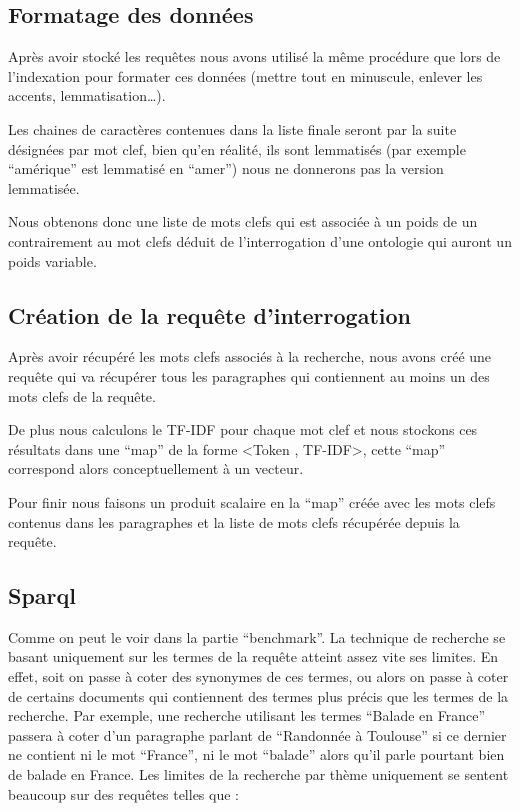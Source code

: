 \documentclass{article}
\begin{document}
\subsection{Formatage des données}

Après avoir stocké les requêtes nous avons utilisé la même procédure que lors de
l’indexation pour formater ces données (mettre tout en minuscule, enlever les
accents, lemmatisation…). 

Les chaines de caractères contenues dans la liste finale seront par la suite désignées par
mot clef, bien qu’en réalité, ils sont lemmatisés (par exemple “amérique” est
lemmatisé en “amer”) nous ne donnerons pas la version lemmatisée.

Nous obtenons donc une liste de mots clefs qui est associée à un poids de un
contrairement au mot clefs déduit de l’interrogation d’une ontologie qui auront un
poids variable.


\subsection{Création de la requête d'interrogation}

Après avoir récupéré les mots clefs associés à la recherche, nous avons créé une
requête qui va récupérer tous les paragraphes qui contiennent au moins un des mots
clefs de la requête. 

De plus nous calculons le TF-IDF pour chaque mot clef et nous stockons ces résultats
dans une “map” de la forme <Token , TF-IDF>, cette “map” correspond alors
conceptuellement à un vecteur. 

Pour finir nous faisons un produit scalaire en la “map” créée avec les mots clefs
contenus dans les paragraphes et la liste de mots clefs récupérée depuis la requête.

\subsection{Sparql}

Comme on peut le voir dans la partie “benchmark”. La technique de recherche se basant
uniquement sur les termes de la requête atteint assez vite ses limites. En effet,
soit on passe à coter des synonymes de ces termes, ou alors on passe à coter de
certains documents qui contiennent des termes plus précis que les termes de la
recherche. Par exemple, une recherche utilisant les termes “Balade en France” passera
à coter d’un paragraphe parlant de “Randonnée à Toulouse” si ce dernier ne contient
ni le mot “France”, ni le mot “balade” alors qu’il parle pourtant bien de balade en
France. Les limites de la recherche par thème uniquement se sentent beaucoup sur des
requêtes telles que :
\end{document}
